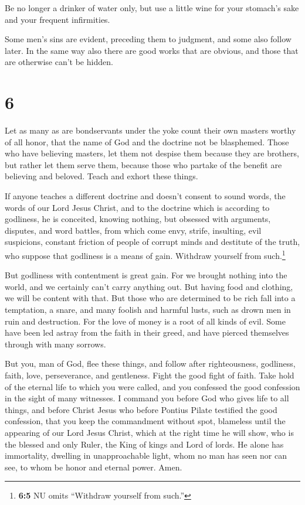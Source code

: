  Be no longer a drinker of water only, but use a little
wine for your stomach's sake and your frequent infirmities.

 Some men's sins are evident, preceding them to judgment,
and some also follow later.  In the same way also there
are good works that are obvious, and those that are otherwise can't be
hidden.

\hypertarget{section-5}{%
\section{6}\label{section-5}}

 Let as many as are bondservants under the yoke count
their own masters worthy of all honor, that the name of God and the
doctrine not be blasphemed.  Those who have believing
masters, let them not despise them because they are brothers, but rather
let them serve them, because those who partake of the benefit are
believing and beloved. Teach and exhort these things.

 If anyone teaches a different doctrine and doesn't
consent to sound words, the words of our Lord Jesus Christ, and to the
doctrine which is according to godliness,  he is
conceited, knowing nothing, but obsessed with arguments, disputes, and
word battles, from which come envy, strife, insulting, evil suspicions,
 constant friction of people of corrupt minds and
destitute of the truth, who suppose that godliness is a means of gain.
Withdraw yourself from such.\footnote{\textbf{6:5} NU omits ``Withdraw
  yourself from such.''}

 But godliness with contentment is great gain.
 For we brought nothing into the world, and we certainly
can't carry anything out.  But having food and clothing,
we will be content with that.  But those who are
determined to be rich fall into a temptation, a snare, and many foolish
and harmful lusts, such as drown men in ruin and destruction.
 For the love of money is a root of all kinds of evil.
Some have been led astray from the faith in their greed, and have
pierced themselves through with many sorrows.

 But you, man of God, flee these things, and follow after
righteousness, godliness, faith, love, perseverance, and gentleness.
 Fight the good fight of faith. Take hold of the eternal
life to which you were called, and you confessed the good confession in
the sight of many witnesses.  I command you before God
who gives life to all things, and before Christ Jesus who before Pontius
Pilate testified the good confession,  that you keep the
commandment without spot, blameless until the appearing of our Lord
Jesus Christ,  which at the right time he will show, who
is the blessed and only Ruler, the King of kings and Lord of lords.
 He alone has immortality, dwelling in unapproachable
light, whom no man has seen nor can see, to whom be honor and eternal
power. Amen.

